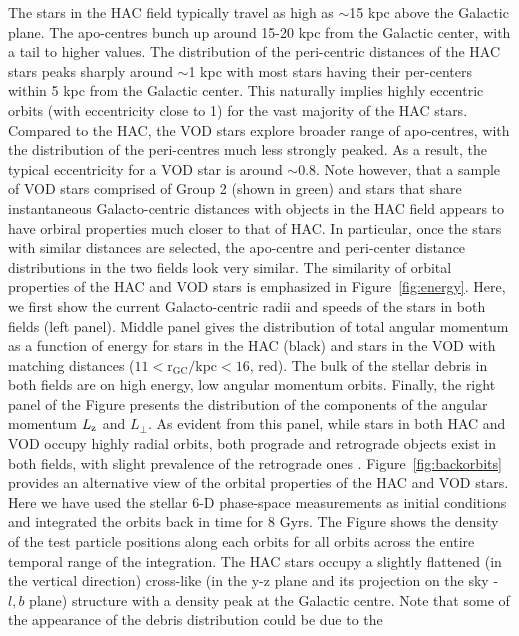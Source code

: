 \documentclass[fleqn,usenatbib]{mnras}
\begin{document}
The stars in the HAC field typically travel as high as $\sim$15 kpc
above the Galactic plane. The apo-centres bunch up around 15-20 kpc
from the Galactic center, with a tail to higher values. The
distribution of the peri-centric distances of the HAC stars peaks
sharply around $\sim$1 kpc with most stars having their per-centers
within 5 kpc from the Galactic center. This naturally implies highly
eccentric orbits (with eccentricity close to 1) for the vast majority
of the HAC stars. Compared to the HAC, the VOD stars explore broader
range of apo-centres, with the distribution of the peri-centres much
less strongly peaked. As a result, the typical eccentricity for a VOD
star is around $\sim$0.8. Note however, that a sample of VOD stars
comprised of Group 2 (shown in green) and stars that share
instantaneous Galacto-centric distances with objects in the HAC field
appears to have orbiral properties much closer to that of HAC. In
particular, once the stars with similar distances are selected, the
apo-centre and peri-center distance distributions in the two fields
look very similar. The similarity of orbital properties of the HAC and
VOD stars is emphasized in Figure~\ref{fig:energy}. Here, we first
show the current Galacto-centric radii and speeds of the stars in both
fields (left panel). Middle panel gives the distribution of total
angular momentum as a function of energy for stars in the HAC (black)
and stars in the VOD with matching distances
($11\mathrm{<r_{GC}}/$kpc$<16$, red). The bulk of the stellar debris
in both fields are on high energy, low angular momentum
orbits. Finally, the right panel of the Figure presents the
distribution of the components of the angular momentum $L_{\rm z}$ and
$L_{\perp}$. As evident from this panel, while stars in both HAC and
VOD occupy highly radial orbits, both prograde and retrograde objects
exist in both fields, with slight prevalence of the retrograde ones
\citep[see also][]{actionhalo,shards,Helmi2018}.
%
Figure~\ref{fig:backorbits} provides an alternative view of the
orbital properties of the HAC and VOD stars. Here we have used the
stellar 6-D phase-space measurements as initial conditions and
integrated the orbits back in time for 8 Gyrs. The Figure shows the
density of the test particle positions along each orbits for all
orbits across the entire temporal range of the integration. The HAC
stars occupy a slightly flattened (in the vertical direction)
cross-like (in the y-z plane and its projection on the sky - $l,b$
plane) structure with a density peak at the Galactic centre. Note that
some of the appearance of the debris distribution could be due to the
\end{document}
